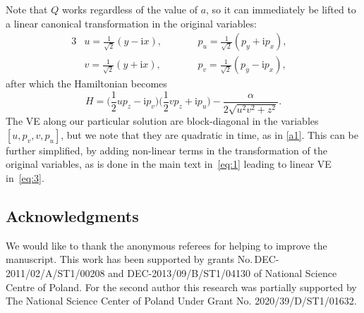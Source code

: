 \documentclass[pdftex]{sigma}
\numberwithin{equation}{section}
\begin{document}
Note that $Q$ works regardless of the value of $a$, so it can immediately be lifted to a linear canonical transformation in the original variables:
\begin{alignat*}{3}
& u = \frac{1}{\sqrt{2}}(y-\mathrm{i} x),\qquad&&
 p_u = \frac{1}{\sqrt{2}}(p_y+\mathrm{i}p_x),&
 \\
& v = \frac{1}{\sqrt{2}}(y+\mathrm{i} x),\qquad&&
 p_v =\frac{1}{\sqrt{2}}(p_y-\mathrm{i}p_x),&
\end{alignat*}
after which the Hamiltonian becomes
\begin{equation*}
 H = \bigg(\frac12 u p_z -\mathrm{i}p_v\bigg)
 \bigg(\frac12 v p_z +\mathrm{i}p_u\bigg)
 -\frac{\alpha}{2\sqrt{u^2v^2+z^2}}.
\end{equation*}
The VE along our particular solution are block-diagonal in the variables $[u,p_v,v,p_u]$, but we note that they are quadratic in time, as in \eqref{a1}. This can be further simplified, by adding non-linear terms in the transformation of the original variables, as is done in the main text in~\eqref{eq:1} leading to linear VE in~\eqref{eq:3}.


\subsection*{Acknowledgments}

We would like to thank the anonymous referees for helping to improve the manuscript.
This work has been supported by grants No.\,DEC-2011/02/A/ST1/00208 and
DEC-2013/09/B/ST1/04130 of National Science Centre of Poland.
For the second author this research was partially supported by The National Science Center of Poland Under Grant No. 2020/39/D/ST1/01632.
\end{document}
